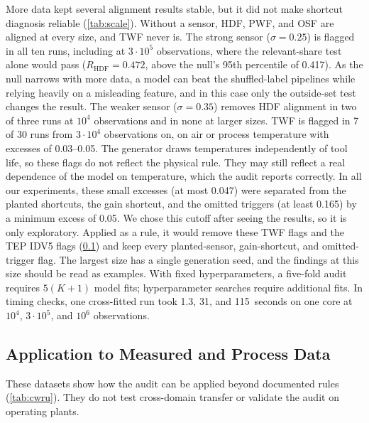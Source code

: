 \documentclass[conference]{IEEEtran}
\begin{document}
More data kept several alignment results stable, but it did not make shortcut diagnosis reliable (\cref{tab:scale}). Without a sensor, HDF, PWF, and OSF are aligned at every size, and TWF never is. The strong sensor ($\sigma=0.25$) is flagged in all ten runs, including at $3\cdot10^5$ observations, where the relevant-share test alone would pass ($R_{\mathrm{HDF}}=0.472$, above the null's 95th percentile of 0.417). As the null narrows with more data, a model can beat the shuffled-label pipelines while relying heavily on a misleading feature, and in this case only the outside-set test changes the result. The weaker sensor ($\sigma=0.35$) removes HDF alignment in two of three runs at $10^4$ observations and in none at larger sizes. TWF is flagged in 7 of 30 runs from $3\cdot10^4$ observations on, on air or process temperature with excesses of 0.03--0.05. The generator draws temperatures independently of tool life, so these flags do not reflect the physical rule. They may still reflect a real dependence of the model on temperature, which the audit reports correctly. In all our experiments, these small excesses (at most 0.047) were separated from the planted shortcuts, the gain shortcut, and the omitted triggers (at least 0.165) by a minimum excess of 0.05. We chose this cutoff after seeing the results, so it is only exploratory. Applied as a rule, it would remove these TWF flags and the TEP IDV5 flags (\cref{sec:cwru}) and keep every planted-sensor, gain-shortcut, and omitted-trigger flag. The largest size has a single generation seed, and the findings at this size should be read as examples. With fixed hyperparameters, a five-fold audit requires $5(K+1)$ model fits; hyperparameter searches require additional fits. In timing checks, one cross-fitted run took 1.3, 31, and 115~seconds on one core at $10^4$, $3\cdot10^5$, and $10^6$ observations.

\subsection{Application to Measured and Process Data}
\label{sec:cwru}

\begin{table}[t]
\centering
\caption{Audit on CWRU bearing data ($K=1{,}000$) and simulated Tennessee
Eastman process data ($K=200$); Holm-adjusted $p$.}
\label{tab:cwru}
\footnotesize
\setlength{\tabcolsep}{2.5pt}

\end{table}

These datasets show how the audit can be applied beyond documented rules (\cref{tab:cwru}). They do not test cross-domain transfer or validate the audit on operating plants.
\end{document}
